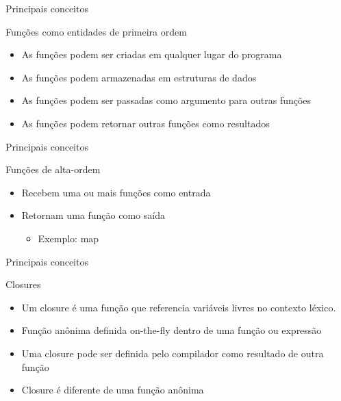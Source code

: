 \begin{frame}{Principais conceitos}
	\begin{block}{Funções como entidades de primeira ordem} 
		\begin{itemize}
			\item As funções podem ser criadas em qualquer lugar do programa
			\item As funções podem armazenadas em estruturas de dados
			\item As funções podem ser passadas como argumento para outras funções
			\item As funções podem retornar outras funções como resultados
		\end{itemize}
	\end{block}
	
	\begin{center}
		
	\end{center}
\end{frame}

\begin{frame}{Principais conceitos}
	\begin{block}{Funções de alta-ordem}
		\begin{itemize}
			\item Recebem uma ou mais funções como entrada
			\item Retornam uma função como saída
			\begin{itemize}
				\item Exemplo: map
			\end{itemize}
		\end{itemize}
	\end{block}
\end{frame}

\begin{frame}{Principais conceitos}
	\begin{block}{Closures}
		\begin{itemize}
			\item Um closure é uma função que referencia variáveis livres no contexto léxico. 
			\item Função anônima definida on-the-fly dentro de uma função ou expressão
			\item Uma closure pode ser definida pelo compilador como resultado de outra função
			\item Closure é diferente de uma função anônima
		\end{itemize}
	\end{block}
	
	\begin{center}
		
	\end{center}
\end{frame}


